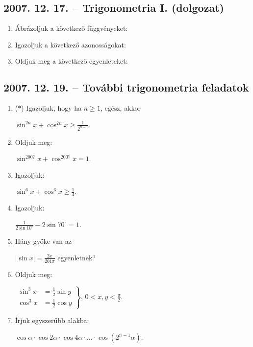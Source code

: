 \subsection*{2007. 12. 17. -- Trigonometria I. (dolgozat)}
\begin{enumerate}
\item Ábrázoljuk a következő függvényeket:
\item Igazoljuk a következő azonosságokat:
\item Oldjuk meg a következő egyenleteket:
\end{enumerate}

\subsection*{2007. 12. 19. -- További trigonometria feladatok}
\begin{enumerate}
\item ($*$) Igazoljuk, hogy ha $n \ge 1$, egész, akkor

$\sin^{2n}x+\cos^{2n}x \ge \displaystyle{\frac{1}{2^{n-1}}}$.
\item Oldjuk meg:

$\sin^{2007}x+\cos^{2007}x=1$.
\item Igazoljuk:

$\sin^6x+\cos^6x \ge \frac{1}{4}$.
\item Igazoljuk:

$\displaystyle{\frac{1}{2\sin 10^{\circ}}-2\sin 70^{\circ}=1}$.
\item Hány gyöke van az

$\displaystyle{|\sin x|=\frac{2x}{201\pi}}$ egyenletnek?
\item Oldjuk meg:

$\left.
\begin{aligned}
\sin^3x&=\frac{1}{2}\sin y\\
\cos^3x&=\frac{1}{2}\cos y
\end{aligned}
\right\}$, $0<x,y<\frac{\pi}{2}$.
\item Írjuk egyszerűbb alakba:

$\cos\alpha \cdot \cos2\alpha \cdot \cos4\alpha \cdot\ldots\cdot \cos\left(2^{n-1}\alpha\right)$.
\end{enumerate}

